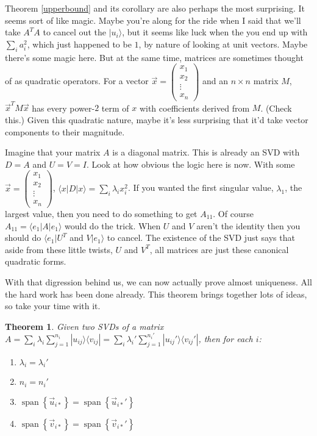 \documentclass{amsbook}
\newtheorem{theorem}{Theorem}
\begin{document}
Theorem \ref{upperbound} and its corollary are also perhaps the most surprising.  It seems sort of like magic.  Maybe you're along for the ride when I said that we'll take $A^TA$ to cancel out the $|u_i\rangle$, but it seems like luck when the you end up with $\sum_ia_i^2$, which just happened to be $1$, by nature of looking at unit vectors.  Maybe there's some magic here.  But at the same time, matrices are sometimes thought of as quadratic operators.  For a vector $\vec x=\left(\begin{array}{c}x_1\\x_2\\\vdots\\x_n\end{array}\right)$ and an $n\times n$ matrix $M$, $\vec x^TM\vec x$ has every power-$2$ term of $x$ with coefficients derived from $M$.  (Check this.)  Given this quadratic nature, maybe it's less surprising that it'd take vector components to their magnitude.

Imagine that your matrix $A$ is a diagonal matrix.  This is already an SVD with $D=A$ and $U=V=I$.  Look at how obvious the logic here is now.  With some $\vec x=\left(\begin{array}{c}x_1\\x_2\\\vdots\\x_n\end{array}\right)$, $\langle x|D|x\rangle=\sum_i\lambda_ix_i^2$.  If you wanted the first singular value, $\lambda_1$, the largest value, then you need to do something to get $A_{11}$.  Of course $A_{11}=\langle e_1|A|e_1\rangle$ would do the trick.  When $U$ and $V$ aren't the identity then you should do $\langle e_1|U^T$ and $V|e_1\rangle$ to cancel.  The existence of the SVD just says that aside from these little twists, $U$ and $V^T$, all matrices are just these canonical quadratic forms.

With that digression behind us, we can now actually prove almost uniqueness.  All the hard work has been done already.  This theorem brings together lots of ideas, so take your time with it.

\begin{theorem}
Given two SVDs of a matrix $A=\sum_i\lambda_i\sum_{j=1}^{n_i}|u_{ij}\rangle\langle v_{ij}|=\sum_i\lambda_i'\sum_{j=1}^{n_i'}|u_{ij}'\rangle\langle v_{ij}'|$, then for each $i$:

\begin{enumerate}
\item $\lambda_i=\lambda_i'$
\item $n_i=n_i'$
\item $\operatorname{span}\left\{\vec u_{i*}\right\}=\operatorname{span}\left\{\vec u_{i*}'\right\}$
\item $\operatorname{span}\left\{\vec v_{i*}\right\}=\operatorname{span}\left\{\vec v_{i*}'\right\}$
\end{enumerate}
\end{theorem}
\end{document}
